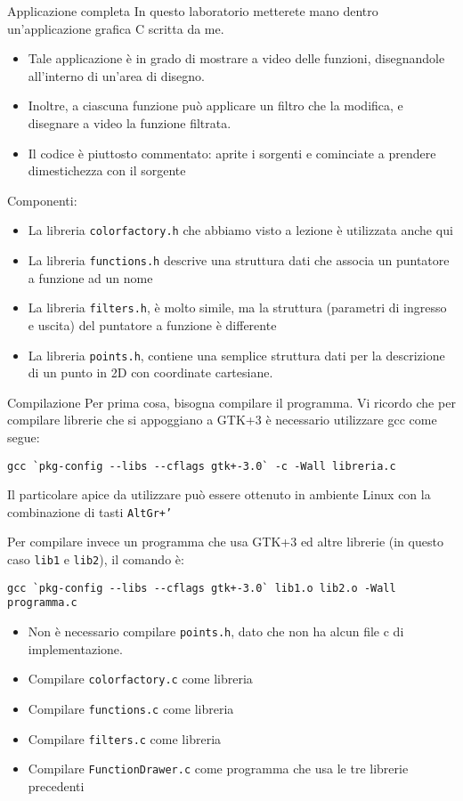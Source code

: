 \documentclass{beamer}
\begin{document}
\begin{frame}[fragile]{Applicazione completa}
In questo laboratorio metterete mano dentro un'applicazione grafica C scritta da me.
\begin{itemize}
 \item Tale applicazione è in grado di mostrare a video delle funzioni, disegnandole all'interno di un'area di disegno.
 \item Inoltre, a ciascuna funzione può applicare un filtro che la modifica, e disegnare a video la funzione filtrata.
 \item Il codice è piuttosto commentato: aprite i sorgenti e cominciate a prendere dimestichezza con il sorgente
\end{itemize}
Componenti:
\begin{itemize}
 \item La libreria \texttt{colorfactory.h} che abbiamo visto a lezione è utilizzata anche qui
 \item La libreria \texttt{functions.h} descrive una struttura dati che associa un puntatore a funzione ad un nome
 \item La libreria \texttt{filters.h}, è molto simile, ma la struttura (parametri di ingresso e uscita) del puntatore a funzione è differente
 \item La libreria \texttt{points.h}, contiene una semplice struttura dati per la descrizione di un punto in 2D con coordinate cartesiane.
\end{itemize}
\end{frame}

\begin{frame}[fragile]{Compilazione}
Per prima cosa, bisogna compilare il programma. Vi ricordo che per compilare librerie che si appoggiano a GTK+3 è necessario utilizzare gcc come segue:
\scriptsize
\begin{verbatim}
gcc `pkg-config --libs --cflags gtk+-3.0` -c -Wall libreria.c
\end{verbatim}
\normalsize
Il particolare apice da utilizzare può essere ottenuto in ambiente Linux con la combinazione di tasti \texttt{AltGr+'}

Per compilare invece un programma che usa GTK+3 ed altre librerie (in questo caso \texttt{lib1} e \texttt{lib2}), il comando è:
\scriptsize
\begin{verbatim}
gcc `pkg-config --libs --cflags gtk+-3.0` lib1.o lib2.o -Wall programma.c
\end{verbatim}
\normalsize
\begin{itemize}
 \item Non è necessario compilare \texttt{points.h}, dato che non ha alcun file c di implementazione.
 \item Compilare \texttt{colorfactory.c} come libreria
 \item Compilare \texttt{functions.c} come libreria
 \item Compilare \texttt{filters.c} come libreria
 \item Compilare \texttt{FunctionDrawer.c} come programma che usa le tre librerie precedenti
\end{itemize}
\end{frame}
\end{document}
